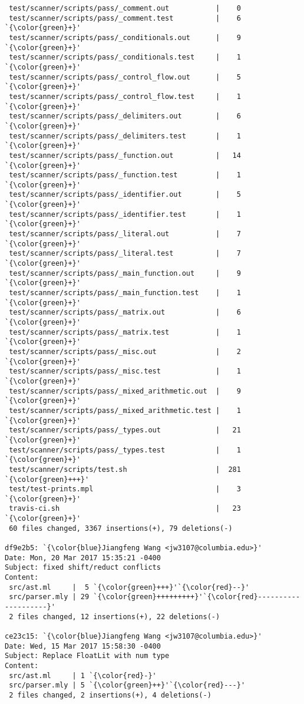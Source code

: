 \begin{lstlisting}
 test/scanner/scripts/pass/_comment.out           |    0
 test/scanner/scripts/pass/_comment.test          |    6 `{\color{green}+}'
 test/scanner/scripts/pass/_conditionals.out      |    9 `{\color{green}+}'
 test/scanner/scripts/pass/_conditionals.test     |    1 `{\color{green}+}'
 test/scanner/scripts/pass/_control_flow.out      |    5 `{\color{green}+}'
 test/scanner/scripts/pass/_control_flow.test     |    1 `{\color{green}+}'
 test/scanner/scripts/pass/_delimiters.out        |    6 `{\color{green}+}'
 test/scanner/scripts/pass/_delimiters.test       |    1 `{\color{green}+}'
 test/scanner/scripts/pass/_function.out          |   14 `{\color{green}+}'
 test/scanner/scripts/pass/_function.test         |    1 `{\color{green}+}'
 test/scanner/scripts/pass/_identifier.out        |    5 `{\color{green}+}'
 test/scanner/scripts/pass/_identifier.test       |    1 `{\color{green}+}'
 test/scanner/scripts/pass/_literal.out           |    7 `{\color{green}+}'
 test/scanner/scripts/pass/_literal.test          |    7 `{\color{green}+}'
 test/scanner/scripts/pass/_main_function.out     |    9 `{\color{green}+}'
 test/scanner/scripts/pass/_main_function.test    |    1 `{\color{green}+}'
 test/scanner/scripts/pass/_matrix.out            |    6 `{\color{green}+}'
 test/scanner/scripts/pass/_matrix.test           |    1 `{\color{green}+}'
 test/scanner/scripts/pass/_misc.out              |    2 `{\color{green}+}'
 test/scanner/scripts/pass/_misc.test             |    1 `{\color{green}+}'
 test/scanner/scripts/pass/_mixed_arithmetic.out  |    9 `{\color{green}+}'
 test/scanner/scripts/pass/_mixed_arithmetic.test |    1 `{\color{green}+}'
 test/scanner/scripts/pass/_types.out             |   21 `{\color{green}+}'
 test/scanner/scripts/pass/_types.test            |    1 `{\color{green}+}'
 test/scanner/scripts/test.sh                     |  281 `{\color{green}+++}'
 test/test-prints.mpl                             |    3 `{\color{green}+}'
 travis-ci.sh                                     |   23 `{\color{green}+}'
 60 files changed, 3367 insertions(+), 79 deletions(-)

df9e2b5: `{\color{blue}Jiangfeng Wang <jw3107@columbia.edu>}'
Date: Mon, 20 Mar 2017 15:35:21 -0400
Subject: fixed shift/reduct conflicts
Content: 
 src/ast.ml     |  5 `{\color{green}+++}'`{\color{red}--}'
 src/parser.mly | 29 `{\color{green}+++++++++}'`{\color{red}--------------------}'
 2 files changed, 12 insertions(+), 22 deletions(-)

ce23c15: `{\color{blue}Jiangfeng Wang <jw3107@columbia.edu>}'
Date: Wed, 15 Mar 2017 15:58:30 -0400
Subject: Replace FloatLit with num type
Content: 
 src/ast.ml     | 1 `{\color{red}-}'
 src/parser.mly | 5 `{\color{green}++}'`{\color{red}---}'
 2 files changed, 2 insertions(+), 4 deletions(-)


\end{lstlisting}
